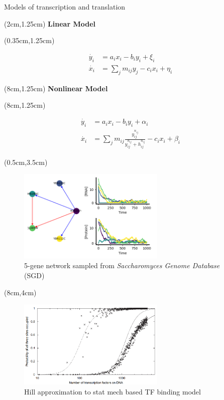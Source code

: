 \documentclass[aspectratio=1610]{beamer}					%
\begin{document}
\begin{frame}{Models of transcription and translation}

\begin{textblock*}{5cm}(2cm,1.25cm)
\textbf{Linear Model}
\end{textblock*}

\begin{textblock*}{7cm}(0.35cm,1.25cm)
\begin{figure}
\begin{align*}
\dot{y_{i}} &= a_{i}x_{i} - b_{i}y_{i} + \xi_{i}\\
\dot{x_{i}} &= \sum_{j}m_{ij}y_{j} - c_{i}x_{i} + \eta_{i}
\end{align*}
\end{figure}
\end{textblock*}

\begin{textblock*}{5cm}(8cm,1.25cm)
\textbf{Nonlinear Model}
\end{textblock*}

\begin{textblock*}{7cm}(8cm,1.25cm)
\begin{figure}
\begin{align*}
\dot{y_{i}} &= a_{i}x_{i} - b_{i}y_{i} + \alpha_{i}\\
\dot{x_{i}} &= \sum_{j}m_{ij}\frac{y_{ij}^{n_{ij}}}{y_{ij}^{n_{ij}}+h_{ij}^{n_{ij}}} - c_{i}x_{i} + \beta_{i}
\end{align*}
\end{figure}
\end{textblock*}


\begin{textblock*}{7cm}(0.5cm,3.5cm)
\begin{figure}
\includegraphics[width=7cm]{linear.png}
\caption{5-gene network sampled from \emph{Saccharomyces Genome Database} (SGD)}
\end{figure}
\end{textblock*}

\begin{textblock*}{7cm}(8cm,4cm)
\begin{figure}
\includegraphics[width=7cm]{hill.png}
\caption{Hill approximation to stat mech based TF binding model}
\end{figure}
\end{textblock*}


\end{frame}
\end{document}
